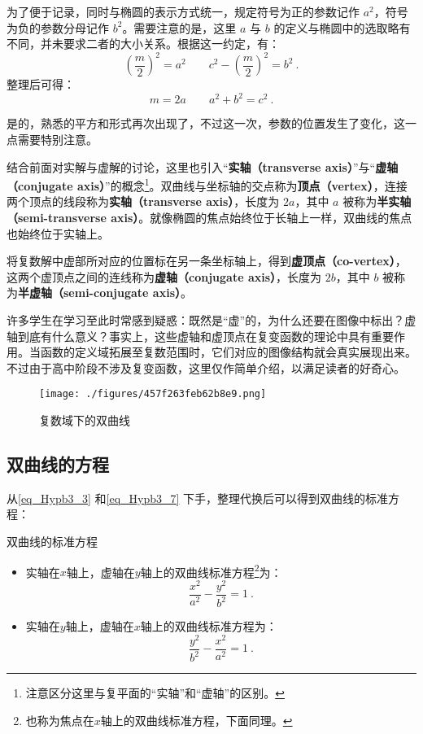 为了便于记录，同时与椭圆的表示方式统一，规定符号为正的参数记作 $a^2$，符号为负的参数分母记作 $b^2$。需要注意的是，这里 $a$ 与 $b$ 的定义与椭圆中的选取略有不同，并未要求二者的大小关系。根据这一约定，有：
\begin{equation}
\left(\displaystyle\frac{m}{2}\right)^2=a^2\qquad c^2-\displaystyle\left(\frac{m}{2}\right)^2=b^2~.
\end{equation}
整理后可得：
\begin{equation}
m=2a\qquad a^2+b^2=c^2~.
\end{equation}

是的，熟悉的平方和形式再次出现了，不过这一次，参数的位置发生了变化，这一点需要特别注意。

结合前面对实解与虚解的讨论，这里也引入“\textbf{实轴（transverse axis）}”与“\textbf{虚轴（conjugate axis）}”的概念\footnote{注意区分这里与复平面的“实轴”和“虚轴”的区别。}。双曲线与坐标轴的交点称为\textbf{顶点（vertex）}，连接两个顶点的线段称为\textbf{实轴（transverse axis）}，长度为 $2a$，其中 $a$ 被称为\textbf{半实轴（semi-transverse axis）}。就像椭圆的焦点始终位于长轴上一样，双曲线的焦点也始终位于实轴上。

将复数解中虚部所对应的位置标在另一条坐标轴上，得到\textbf{虚顶点（co-vertex）}，这两个虚顶点之间的连线称为\textbf{虚轴（conjugate axis）}，长度为 $2b$，其中 $b$ 被称为\textbf{半虚轴（semi-conjugate axis）}。

许多学生在学习至此时常感到疑惑：既然是“虚”的，为什么还要在图像中标出？虚轴到底有什么意义？事实上，这些虚轴和虚顶点在复变函数的理论中具有重要作用。当函数的定义域拓展至复数范围时，它们对应的图像结构就会真实展现出来。不过由于高中阶段不涉及复变函数，这里仅作简单介绍，以满足读者的好奇心。

\begin{figure}[ht]
\centering
\texttt{[image: ./figures/457f263feb62b8e9.png]}
\caption{复数域下的双曲线} \label{fig_Hypb3_2}
\end{figure}

\subsection{双曲线的方程}

从\autoref{eq_Hypb3_3} 和\autoref{eq_Hypb3_7} 下手，整理代换后可以得到双曲线的标准方程：

\begin{theorem}{双曲线的标准方程}
\begin{itemize}
\item 实轴在$x$轴上，虚轴在$y$轴上的双曲线标准方程\footnote{也称为焦点在$x$轴上的双曲线标准方程，下面同理。}为：
\begin{equation}\label{eq_Hypb3_4}
\frac{x^2}{a^2} - \frac{y^2}{b^2} = 1~.
\end{equation}
\item 实轴在$y$轴上，虚轴在$x$轴上的双曲线标准方程为：
\begin{equation}
\frac{y^2}{b^2} -\frac{x^2}{a^2}  = 1~.
\end{equation}
\end{itemize}
\end{theorem}



